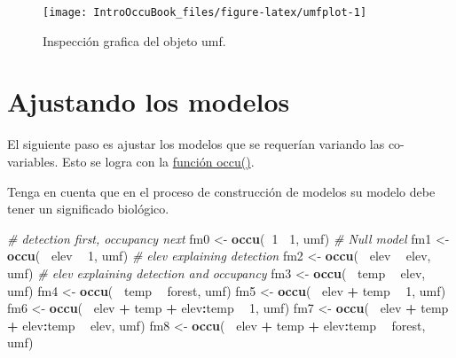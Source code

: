 \documentclass[
]{book}
\newenvironment{Shaded}{\begin{snugshade}}{\end{snugshade}}
\newcommand{\CommentTok}[1]{\textcolor[rgb]{0.56,0.35,0.01}{\textit{#1}}}
\newcommand{\DecValTok}[1]{\textcolor[rgb]{0.00,0.00,0.81}{#1}}
\newcommand{\KeywordTok}[1]{\textcolor[rgb]{0.13,0.29,0.53}{\textbf{#1}}}
\newcommand{\NormalTok}[1]{#1}
\newcommand{\OperatorTok}[1]{\textcolor[rgb]{0.81,0.36,0.00}{\textbf{#1}}}
\newcommand{\StringTok}[1]{\textcolor[rgb]{0.31,0.60,0.02}{#1}}
\begin{document}
\begin{figure}
\texttt{[image: IntroOccuBook\_files/figure-latex/umfplot-1]} \caption[fig]{Inspección grafica del objeto umf.}\label{fig:umfplot}
\end{figure}

\hypertarget{ajustando-los-modelos}{%
\section{Ajustando los modelos}\label{ajustando-los-modelos}}

El siguiente paso es ajustar los modelos que se requerían variando las co-variables. Esto se logra con la \href{http://www.rdocumentation.org/packages/unmarked/versions/0.11-0/topics/occu}{función occu()}.

Tenga en cuenta que en el proceso de construcción de modelos su modelo debe tener un significado biológico.

\begin{Shaded}
\begin{Highlighting}[]
\CommentTok{# detection first, occupancy next}
\NormalTok{fm0 <-}\StringTok{ }\KeywordTok{occu}\NormalTok{(}\OperatorTok{~}\DecValTok{1} \OperatorTok{~}\DecValTok{1}\NormalTok{, umf) }\CommentTok{# Null model}
\NormalTok{fm1 <-}\StringTok{ }\KeywordTok{occu}\NormalTok{(}\OperatorTok{~}\StringTok{ }\NormalTok{elev }\OperatorTok{~}\StringTok{ }\DecValTok{1}\NormalTok{, umf) }\CommentTok{# elev explaining detection}
\NormalTok{fm2 <-}\StringTok{ }\KeywordTok{occu}\NormalTok{(}\OperatorTok{~}\StringTok{ }\NormalTok{elev }\OperatorTok{~}\StringTok{ }\NormalTok{elev, umf) }\CommentTok{# elev explaining detection and occupancy}
\NormalTok{fm3 <-}\StringTok{ }\KeywordTok{occu}\NormalTok{(}\OperatorTok{~}\StringTok{ }\NormalTok{temp }\OperatorTok{~}\StringTok{ }\NormalTok{elev, umf)}
\NormalTok{fm4 <-}\StringTok{ }\KeywordTok{occu}\NormalTok{(}\OperatorTok{~}\StringTok{ }\NormalTok{temp }\OperatorTok{~}\StringTok{ }\NormalTok{forest, umf)}
\NormalTok{fm5 <-}\StringTok{ }\KeywordTok{occu}\NormalTok{(}\OperatorTok{~}\StringTok{ }\NormalTok{elev }\OperatorTok{+}\StringTok{ }\NormalTok{temp }\OperatorTok{~}\StringTok{ }\DecValTok{1}\NormalTok{, umf)}
\NormalTok{fm6 <-}\StringTok{ }\KeywordTok{occu}\NormalTok{(}\OperatorTok{~}\StringTok{ }\NormalTok{elev }\OperatorTok{+}\StringTok{ }\NormalTok{temp }\OperatorTok{+}\StringTok{ }\NormalTok{elev}\OperatorTok{:}\NormalTok{temp }\OperatorTok{~}\StringTok{ }\DecValTok{1}\NormalTok{, umf)}
\NormalTok{fm7 <-}\StringTok{ }\KeywordTok{occu}\NormalTok{(}\OperatorTok{~}\StringTok{ }\NormalTok{elev }\OperatorTok{+}\StringTok{ }\NormalTok{temp }\OperatorTok{+}\StringTok{ }\NormalTok{elev}\OperatorTok{:}\NormalTok{temp }\OperatorTok{~}\StringTok{ }\NormalTok{elev, umf)}
\NormalTok{fm8 <-}\StringTok{ }\KeywordTok{occu}\NormalTok{(}\OperatorTok{~}\StringTok{ }\NormalTok{elev }\OperatorTok{+}\StringTok{ }\NormalTok{temp }\OperatorTok{+}\StringTok{ }\NormalTok{elev}\OperatorTok{:}\NormalTok{temp }\OperatorTok{~}\StringTok{ }\NormalTok{forest, umf)}
\end{Highlighting}
\end{Shaded}
\end{document}
